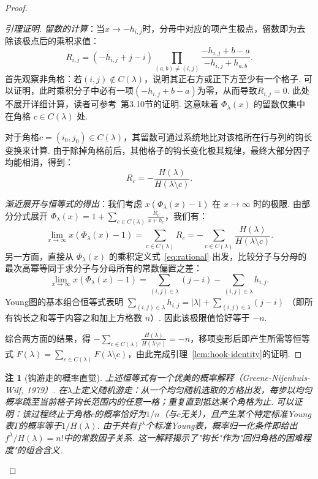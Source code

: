 \documentclass{sjtureport}
\newtheorem{remark}{注}[chapter]
\begin{document}
\begin{proof}
\begin{proof}[引理证明]
    \emph{留数的计算}：当$x\to -h_{i,j}$时，分母中对应的项产生极点，留数即为去除该极点后的乘积求值：
    \begin{equation*}
        R_{i,j} = (-h_{i,j}+j-i) \prod_{(a,b)\neq (i,j)}\frac{-h_{i,j}+b-a}{-h_{i,j}+h_{a,b}}.
    \end{equation*}
    首先观察非角格：若$(i,j)\notin C(\lambda)$，说明其正右方或正下方至少有一个格子. 可以证明，此时乘积分子中必有一项$(-h_{i,j}+b-a)$为零，从而导致$R_{i,j}=0$. 此处不展开详细计算，读者可参考~\cite{Sagan}第3.10节的证明. 这意味着 $\Phi_\lambda(x)$ 的留数仅集中在角格 $c\in C(\lambda)$ 处. 

    对于角格$c=(i_0,j_0)\in C(\lambda)$，其留数可通过系统地比对该格所在行与列的钩长变换来计算. 由于除掉角格前后，其他格子的钩长变化极其规律，最终大部分因子均能相消，得到：
    \begin{equation}\label{eq:residue}
        R_c = -\frac{H(\lambda)}{H(\lambda\setminus c)}.
    \end{equation}

    \emph{渐近展开与恒等式的得出}：我们考虑 $x(\Phi_\lambda(x) - 1)$ 在 $x\to \infty$ 时的极限. 由部分分式展开 $\Phi_\lambda(x) = 1 + \sum_{c\in C(\lambda)} \frac{R_c}{x+h_c}$，我们有：
    \begin{equation*}
        \lim_{x\to\infty} x(\Phi_\lambda(x) - 1) = \sum_{c\in C(\lambda)} R_c = -\sum_{c\in C(\lambda)} \frac{H(\lambda)}{H(\lambda\setminus c)}.
    \end{equation*}
    另一方面，直接从 $\Phi_\lambda(x)$ 的乘积定义式~\eqref{eq:rational} 出发，比较分子与分母的最次高幂等同于求分子与分母所有的常数偏置之差：
    \begin{equation*}
        \lim_{x\to\infty} x(\Phi_\lambda(x) - 1) = \sum_{(i,j)\in\lambda} (j-i) - \sum_{(i,j)\in\lambda} h_{i,j}.
    \end{equation*}
    Young图的基本组合恒等式表明 $\sum_{(i,j)\in\lambda} h_{i,j} = |\lambda| + \sum_{(i,j)\in\lambda} (j-i)$ （即所有钩长之和等于内容之和加上方格数 $n$）. 因此该极限值恰好等于 $-n$. 
    
    综合两方面的结果，得 $-\sum_{c\in C(\lambda)} \frac{H(\lambda)}{H(\lambda\setminus c)} = -n$，移项变形后即产生所需等恒等式 $F(\lambda) = \sum_{c\in C(\lambda)} F(\lambda\setminus c)$，由此完成引理~\ref{lem:hook-identity}的证明.  
\end{proof}

\begin{remark}[钩游走的概率直觉]
    上述恒等式有一个优美的概率解释（Greene-Nijenhuis-Wilf, 1979）. 在$\lambda$上定义随机游走：从一个均匀随机选取的方格出发，每步以均匀概率跳至当前格子钩长范围内的任意一格；重复直到抵达某个角格为止. 可以证明：该过程终止于角格$c$的概率恰好为$1/n$（与$c$无关），且产生某个特定标准Young表$T$的概率等于$1/H(\lambda)$. 由于共有$f^\lambda$个标准Young表，概率归一化条件即给出$f^\lambda/H(\lambda)=n!$中的常数因子关系. 这一解释揭示了"钩长"作为"回归角格的困难程度"的组合含义. 
\end{remark}


\end{proof}
\end{document}
